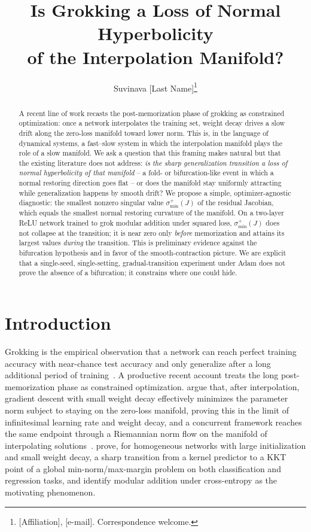 \documentclass[11pt]{article}
\title{Is Grokking a Loss of Normal Hyperbolicity\\ of the Interpolation Manifold?}
\author{Suvinava [Last Name]\thanks{[Affiliation], [e-mail]. Correspondence welcome.}}
\date{}
\newcommand{\sminp}{\sigma_{\min}^{+}}
\begin{document}
\maketitle

\begin{abstract}
A recent line of work recasts the post-memorization phase of grokking as
constrained optimization: once a network interpolates the training set,
weight decay drives a slow drift along the zero-loss manifold toward lower
norm. This is, in the language of dynamical systems, a fast--slow system in
which the interpolation manifold plays the role of a slow manifold. We ask a
question that this framing makes natural but that the existing literature
does not address: \emph{is the sharp generalization transition a loss of
normal hyperbolicity of that manifold} -- a fold- or bifurcation-like event
in which a normal restoring direction goes flat -- or does the manifold stay
uniformly attracting while generalization happens by smooth drift? We propose
a simple, optimizer-agnostic diagnostic: the smallest nonzero singular value
$\sminp(J)$ of the residual Jacobian, which equals the smallest normal
restoring curvature of the manifold. On a two-layer ReLU network trained to
grok modular addition under squared loss, $\sminp(J)$ does not collapse at the
transition; it is near zero only \emph{before} memorization and attains its
largest values \emph{during} the transition. This is preliminary evidence
against the bifurcation hypothesis and in favor of the smooth-contraction
picture. We are explicit that a single-seed, single-setting, gradual-transition
experiment under Adam does not prove the absence of a bifurcation; it
constrains where one could hide.
\end{abstract}

\section{Introduction}
Grokking is the empirical observation that a network can reach perfect
training accuracy with near-chance test accuracy and only generalize after a
long additional period of training~\cite{power2022}. A productive recent
account treats the long post-memorization phase as constrained optimization.
\citet{musat2025} argue that, after interpolation, gradient descent with small
weight decay effectively minimizes the parameter norm subject to staying on
the zero-loss manifold, proving this in the limit of infinitesimal learning
rate and weight decay, and a concurrent framework reaches the same endpoint
through a Riemannian norm flow on the manifold of interpolating
solutions~\cite{boursier2025}. \citet{lyu2024} prove, for homogeneous networks
with large initialization and small weight decay, a sharp transition from a
kernel predictor to a KKT point of a global min-norm/max-margin problem on
both classification and regression tasks, and identify modular addition under
cross-entropy as the motivating phenomenon.
\end{document}
